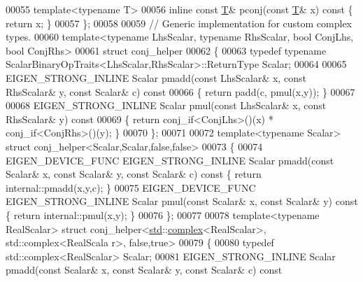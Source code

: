 \begin{DoxyCode}
00055   \textcolor{keyword}{template}<\textcolor{keyword}{typename} T>
00056   \textcolor{keyword}{inline} \textcolor{keyword}{const} \hyperlink{group___sparse_core___module_class_eigen_1_1_triplet}{T}& pconj(\textcolor{keyword}{const} \hyperlink{group___sparse_core___module_class_eigen_1_1_triplet}{T}& x)\textcolor{keyword}{ const }\{ \textcolor{keywordflow}{return} x; \}
00057 \};
00058 
00059 \textcolor{comment}{// Generic implementation for custom complex types.}
00060 \textcolor{keyword}{template}<\textcolor{keyword}{typename} LhsScalar, \textcolor{keyword}{typename} RhsScalar, \textcolor{keywordtype}{bool} ConjLhs, \textcolor{keywordtype}{bool} ConjRhs>
00061 \textcolor{keyword}{struct }conj\_helper
00062 \{
00063   \textcolor{keyword}{typedef} \textcolor{keyword}{typename} ScalarBinaryOpTraits<LhsScalar,RhsScalar>::ReturnType Scalar;
00064 
00065   EIGEN\_STRONG\_INLINE Scalar pmadd(\textcolor{keyword}{const} LhsScalar& x, \textcolor{keyword}{const} RhsScalar& y, \textcolor{keyword}{const} Scalar& c)\textcolor{keyword}{ const}
00066 \textcolor{keyword}{  }\{ \textcolor{keywordflow}{return} padd(c, pmul(x,y)); \}
00067 
00068   EIGEN\_STRONG\_INLINE Scalar pmul(\textcolor{keyword}{const} LhsScalar& x, \textcolor{keyword}{const} RhsScalar& y)\textcolor{keyword}{ const}
00069 \textcolor{keyword}{  }\{ \textcolor{keywordflow}{return} conj\_if<ConjLhs>()(x) *  conj\_if<ConjRhs>()(y); \}
00070 \};
00071 
00072 \textcolor{keyword}{template}<\textcolor{keyword}{typename} Scalar> \textcolor{keyword}{struct }conj\_helper<Scalar,Scalar,false,false>
00073 \{
00074   EIGEN\_DEVICE\_FUNC EIGEN\_STRONG\_INLINE Scalar pmadd(\textcolor{keyword}{const} Scalar& x, \textcolor{keyword}{const} Scalar& y, \textcolor{keyword}{const} Scalar& c)\textcolor{keyword}{
       const }\{ \textcolor{keywordflow}{return} internal::pmadd(x,y,c); \}
00075   EIGEN\_DEVICE\_FUNC EIGEN\_STRONG\_INLINE Scalar pmul(\textcolor{keyword}{const} Scalar& x, \textcolor{keyword}{const} Scalar& y)\textcolor{keyword}{ const }\{ \textcolor{keywordflow}{return} 
      internal::pmul(x,y); \}
00076 \};
00077 
00078 \textcolor{keyword}{template}<\textcolor{keyword}{typename} RealScalar> \textcolor{keyword}{struct }conj\_helper<\hyperlink{namespacestd}{std}::\hyperlink{structcomplex}{complex}<RealScalar>, std::complex<RealScala
      r>, false,true>
00079 \{
00080   \textcolor{keyword}{typedef} std::complex<RealScalar> Scalar;
00081   EIGEN\_STRONG\_INLINE Scalar pmadd(\textcolor{keyword}{const} Scalar& x, \textcolor{keyword}{const} Scalar& y, \textcolor{keyword}{const} Scalar& c)\textcolor{keyword}{ const}

\end{DoxyCode}
